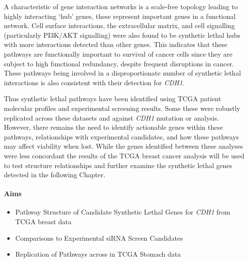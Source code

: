A characteristic of gene interaction networks is a \gls{scale-free} topology leading to highly interacting ‘hub’ genes, these represent important genes in a functional network. Cell surface interactions, the extracellular matrix, and cell signalling (particularly PI3K/AKT signalling) were also found to be \gls{synthetic lethal} hubs with more interactions detected than other genes. This indicates that these pathways are functionally important to survival of cancer cells since they are subject to high \gls{functional redundancy}, despite frequent disruptions in cancer. These pathways being involved in a disproportionate number of \gls{synthetic lethal} interactions is also consistent with their detection for \textit{CDH1}.

Thus \gls{synthetic lethal} pathways have been identified using \gls{TCGA} patient molecular profiles%
and experimental screening results. Some these were robustly replicated across these datasets and against \textit{CDH1} \gls{mutation} or  analysis. However, there remains the need to identify actionable genes within these pathways, relationships with experimental candidates, and how these pathways may affect viability when lost. While the genes identified between these analyses were less concordant the results of the \gls{TCGA} breast cancer analysis will be used to test  structure relationships and further examine the \gls{synthetic lethal} genes detected in the following Chapter.

\clearpage

\iffalse

\paragraph{Aims}

  \begin{itemize}
   \item Pathway Structure of Candidate Synthetic Lethal Genes for \textit{\textit{CDH1}} from \gls{TCGA} breast data
   
   \bigskip
   
   \item Comparisons to Experimental \gls{siRNA} Screen Candidates
   
   \bigskip
   
   \item Replication of Pathways across in \gls{TCGA} Stomach data
  \end{itemize}

